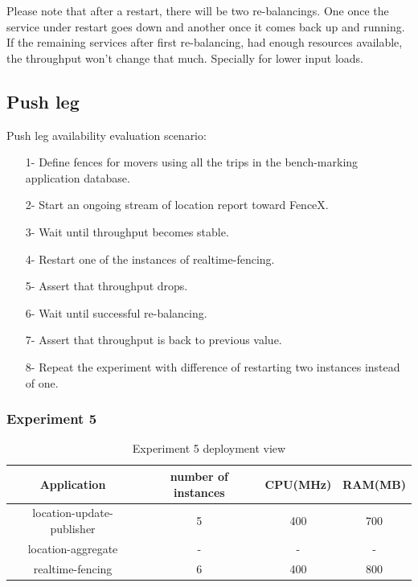 \documentclass[a4]{report}
\begin{document}
    Please note that after a restart, there will be two re-balancings.
    One once the service under restart goes down and another once it comes back up and running.
    If the remaining services after first re-balancing, had enough resources available, the throughput won't change
    that much.
    Specially for lower input loads.

    \subsection{Push leg}
    Push leg availability evaluation scenario:
    \begin{itemize}
        \item[1-] Define fences for movers using all the trips in the bench-marking application database.
        \item[2-] Start an ongoing stream of location report toward FenceX.
        \item[3-] Wait until throughput becomes stable.
        \item[4-] Restart one of the instances of realtime-fencing.
        \item[5-] Assert that throughput drops.
        \item[6-] Wait until successful re-balancing.
        \item[7-] Assert that throughput is back to previous value.
        \item[8-] Repeat the experiment with difference of restarting two instances instead of one.
    \end{itemize}

    \clearpage

    \subsubsection{Experiment 5}
    \begin{table}[h!]
        \centering
        \begin{tabular}{|c|c|c|c|}
            \hline
            Application               & number of instances & CPU(MHz) & RAM(MB) \\
            \hline
            location-update-publisher & 5                   & 400      & 700     \\
            location-aggregate        & -                   & -        & -       \\
            realtime-fencing          & 6                   & 400      & 800     \\
            \hline
        \end{tabular}
        \caption{Experiment 5 deployment view}
        \label{table:ex5-dv}
    \end{table}
\end{document}
